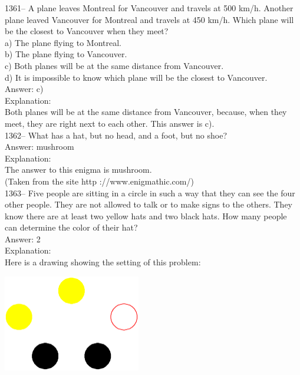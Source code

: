 \documentclass[letterpaper, 12pt]{article}
\begin{document}
1361-- A plane leaves Montreal for Vancouver and travels at 500 km/h. Another plane leaved Vancouver for Montreal and travels at 450 km/h. Which plane will be the closest to Vancouver when they meet?\\

a) The plane flying to Montreal.\\
b) The plane flying to Vancouver.\\
c) Both planes will be at the same distance from Vancouver.\\
d) It is impossible to know which plane will be the closest to Vancouver.\\

Answer: c)\\

Explanation: \\
Both planes will be at the same distance from Vancouver, because, when they meet, they are right next to each other.
This answer is c).\\



1362-- What has a hat, but no head, and a foot, but no shoe?\\

Answer: mushroom\\

Explanation: \\
The answer to this enigma is mushroom.\\
(Taken from the site http ://www.enigmathic.com/)\\



1363-- Five people are sitting in a circle in such a way that they can see the four other people. They are not allowed to talk or to make signs to the others. They know there are at least two yellow hats and two black hats. How many people can determine the color of their hat?\\

Answer: 2\\

Explanation: \\
Here is a drawing showing the setting of this problem:
    \begin{center}
    \includegraphics[width=6cm,bb=0 0 400 400]{chapeaux.eps}
    \end{center}
\end{document}
